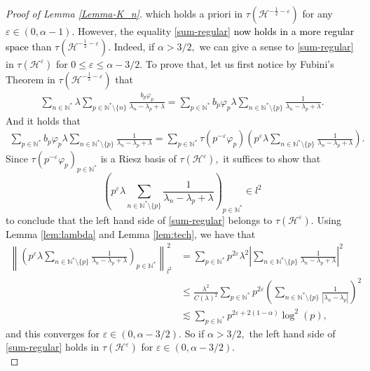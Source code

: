 \documentclass[10pt,a4paper]{amsart}
\begin{document}
\begin{proof}[Proof of Lemma \ref{Lemma-K_n}]
which holds a priori in $\tau(\mathcal{H}^{-\frac{1}{2}-\varepsilon})$ for any $\varepsilon \in (0,\alpha-1).$ However, the equality \eqref{sum-regular} \textcolor{black}{now holds in a more regular space} than $\tau(\mathcal{H}^{-\frac{1}{2}-\varepsilon}).$ Indeed, if $\alpha>3/2,$ we can give a sense to \eqref{sum-regular} in $\tau(\mathcal{H}^{\varepsilon})$ for $0\leq \varepsilon\leq \alpha-3/2.$ To prove that, let us first notice by Fubini's Theorem in $\tau(\mathcal{H}^{-\frac{1}{2}-\varepsilon})$ that
\begin{align*}
   \sum_{n\in \mathbb{N}^*}\lambda \sum_{p\in \mathbb{N}^*\setminus\{n\}}\frac{b_{p}\varphi_p}{\lambda_n-\lambda_p+\lambda} = \sum_{p\in \mathbb{N}^*}b_{p}\varphi_p\lambda \sum_{n\in \mathbb{N}^*\setminus\{p\}}\frac{1}{\lambda_n-\lambda_p+\lambda}.
\end{align*}
And it holds that 
\begin{align*}
    \sum_{p\in \mathbb{N}^*}b_{p}\varphi_p\lambda \sum_{n\in \mathbb{N}^*\setminus\{p\}}\frac{1}{\lambda_n-\lambda_p+\lambda}=\sum_{p\in \mathbb{N}^*}\tau(p^{-\varepsilon}\varphi_p) \left(p^{\varepsilon}\lambda\sum_{n\in \mathbb{N}^*\setminus\{p\}}\frac{1}{\lambda_n-\lambda_p+\lambda}\right).
\end{align*}
Since $\tau(p^{-\varepsilon}\varphi_p)_{p\in \mathbb{N}^*}$ is a Riesz basis of $\tau(\mathcal{H}^{\varepsilon}),$ it suffices to show that \[\left(p^{\varepsilon}\lambda\displaystyle\sum_{n\in \mathbb{N}^*\setminus\{p\}}\frac{1}{\lambda_n-\lambda_p+\lambda}\right)_{p\in \mathbb{N}^*}\in l^2\] to conclude that the left hand side of \eqref{sum-regular} belongs to  $\tau(\mathcal{H}^{\varepsilon}).$ Using Lemma \ref{lem:lambda} and Lemma \ref{lem:tech}, we have that
\begin{align*}
    \left\|\left(p^{\varepsilon}\lambda\displaystyle\sum_{n\in \mathbb{N}^*\setminus\{p\}}\frac{1}{\lambda_n-\lambda_p+\lambda}\right)_{p\in \mathbb{N}^*}\right\|^2_{l^2}&=\sum_{p\in \mathbb{N}^*}p^{2\varepsilon}\lambda^2\left|\displaystyle\sum_{n\in \mathbb{N}^*\setminus\{p\}}\frac{1}{\lambda_n-\lambda_p+\lambda}\right|^2\\
    &\leq \frac{\lambda^2}{C(\lambda)^2}\sum_{p\in \mathbb{N}^*}p^{2\varepsilon}\left(\displaystyle\sum_{n\in \mathbb{N}^*\setminus\{p\}}\frac{1}{|\lambda_n-\lambda_p|}\right)^2\\
    &\lesssim\sum_{p\in \mathbb{N}^*} p^{2\varepsilon+2(1-\alpha)}\log^2(p),
\end{align*} 
and this converges for $\varepsilon \in (0,\alpha-3/2).$ So if $\alpha>3/2,$ the left hand side of \eqref{sum-regular} holds in $\tau(\mathcal{H}^{\varepsilon})$ for $\varepsilon \in (0,\alpha-3/2).$\\ 


\end{proof}
\end{document}

